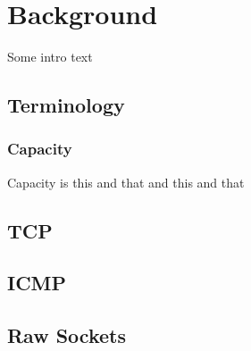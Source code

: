 \chapter{Background}
Some intro text

\section{Terminology}

\subsection*{Capacity}
Capacity is this and that and this and that

\section{TCP}

\section{ICMP}

\section{Raw Sockets}



